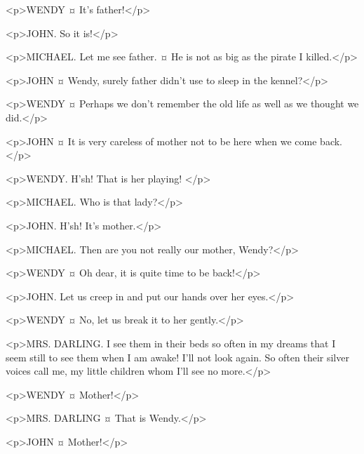 \begin{drama}
<p>WENDY ¤
It's father!</p>

<p>JOHN. So it is!</p>

<p>MICHAEL. Let me see father.
¤
He is not as big as the pirate I killed.</p>

<p>JOHN ¤
Wendy, surely father didn't use to sleep in the kennel?</p>

<p>WENDY ¤
Perhaps we don't remember the old life as well as we thought we did.</p>

<p>JOHN ¤
It is very careless of mother not to be here when we come back.</p>


<p>WENDY. H'sh!
That is her playing!
</p>

<p>MICHAEL. Who is that lady?</p>

<p>JOHN. H'sh! It's mother.</p>

<p>MICHAEL. Then are you not really our mother, Wendy?</p>

<p>WENDY ¤
Oh dear, it is quite time to be back!</p>

<p>JOHN. Let us creep in and put our hands over her eyes.</p>

<p>WENDY ¤
No, let us break it to her gently.</p>


<p>MRS. DARLING. I see them in their beds so often in my dreams that I seem still to see them when I am awake! I'll not look again.
So often their silver voices call me, my little children whom I'll see no more.</p>


<p>WENDY ¤
Mother!</p>

<p>MRS. DARLING ¤
That is Wendy.</p>

<p>JOHN ¤
Mother!</p>


\end{drama}
